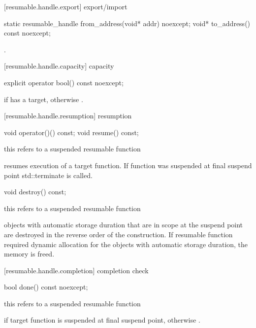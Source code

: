 [resumable.handle.export]{ export/import}
\begin{itemdecl}
  static resumable_handle from_address(void* addr) noexcept;		
  void* to_address() const noexcept;
\end{itemdecl}

\begin{itemdescr}
  \pnum
  \postconditions {}.
\end{itemdescr}

[resumable.handle.capacity]{ capacity}
\begin{itemdecl}
  explicit operator bool() const noexcept;
\end{itemdecl}

\begin{itemdescr}
  \pnum
  \returns {} if  has a target, otherwise .
\end{itemdescr}

[resumable.handle.resumption]{ resumption}
\begin{itemdecl}
  void operator()() const;
  void resume() const;	
\end{itemdecl}
\begin{itemdescr}
  \pnum
  \precondition *this refers to a suspended resumable function
  
  \pnum
  \effects resumes execution of a target function. If function was suspended
  at final suspend point std::terminate is called.
\end{itemdescr}

\begin{itemdecl}
  void destroy() const;
\end{itemdecl}
\begin{itemdescr}
  \pnum
  \precondition *this refers to a suspended resumable function
  
  \pnum
  \effects objects with automatic storage duration that are in scope
  at the suspend point are destroyed in the reverse order of the construction. If resumable function required dynamic allocation
  for the objects with automatic storage duration, the memory
  is freed.
\end{itemdescr}

[resumable.handle.completion]{ completion check}
\begin{itemdecl}
  bool done() const noexcept; 
\end{itemdecl}
\begin{itemdescr}
  \pnum
  \precondition *this refers to a suspended resumable function
  
  \pnum
  \returns {} if target function is suspended
  at final suspend point, otherwise .
\end{itemdescr}

